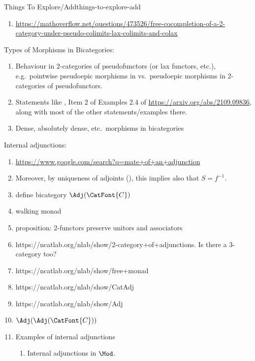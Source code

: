 \begin{remark}{Things To Explore/Add}{things-to-explore-add}
\begin{enumerate}
        \item \url{https://mathoverflow.net/questions/473526/free-cocompletion-of-a-2-category-under-pseudo-colimits-lax-colimits-and-colax}
    \end{enumerate}
    Types of Morphisms in Bicategories:
    \begin{enumerate}
        \item Behaviour in 2-categories of pseudofunctors (or lax functors, etc.), e.g.\ pointwise pseudoepic morphisms in vs.\ pseudoepic morphisms in 2-categories of pseudofunctors.
        \item Statements like , Item 2 of Examples 2.4 of \url{https://arxiv.org/abs/2109.09836}, along with most of the other statements/examples there.
        \item Dense, absolutely dense, etc.\ morphisms in bicategories
    \end{enumerate}
    Internal adjunctions:
    \begin{enumerate}
        \item \url{https://www.google.com/search?q=mate+of+an+adjunction}
        \item Moreover, by uniqueness of adjoints (), this implies also that $S=f^{-1}$.
        \item define bicategory $\Adj(\CatFont{C})$
        \item walking monad
        \item proposition: 2-functors preserve unitors and associators
        \item https://ncatlab.org/nlab/show/2-category+of+adjunctions. Is there a 3-category too?
        \item https://ncatlab.org/nlab/show/free+monad
        \item https://ncatlab.org/nlab/show/CatAdj
        \item https://ncatlab.org/nlab/show/Adj
        \item $\Adj(\Adj(\CatFont{C}))$
        \item Examples of internal adjunctions
            \begin{enumerate}
                \item Internal adjunctions in $\Mod$.

\end{enumerate}
\end{enumerate}
\end{remark}

